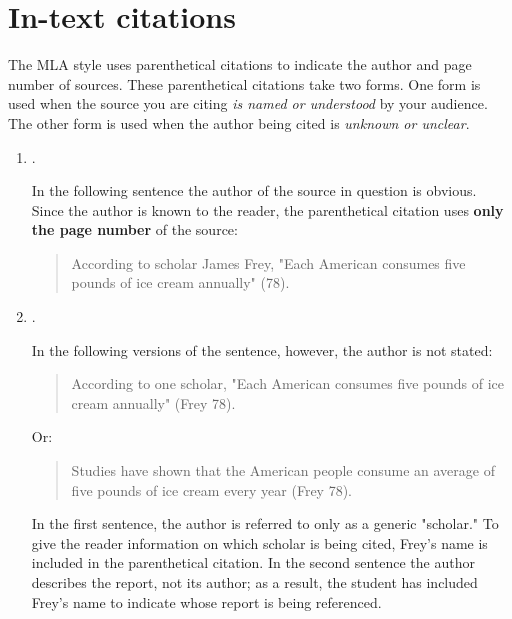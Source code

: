 \newpage

\section{In-text citations}
The MLA style uses parenthetical citations to indicate the author and page number of sources. These parenthetical citations take two forms. One form is used when the source you are citing \emph{is named or understood} by your audience. The other form is used when the author being cited is \emph{unknown or unclear}. 

\begin{enumerate}

\item {}. \smallskip

In the following sentence the author of the source in question is obvious. Since the author is known to the reader, the parenthetical citation uses \textbf{only the page number} of the source: 

\begin{quote}
According to scholar James Frey, "Each American consumes five pounds of ice cream 
annually" (78).
\end{quote}

\item {}. \smallskip

In the following versions of the sentence, however, the author is not stated:

\begin{quote}
According to one scholar, "Each American consumes five pounds of ice cream 
annually" (Frey 78).
\end{quote}

\noindent Or:
\begin{quote}
Studies have shown that the American people consume an average of five pounds of ice 
cream every year (Frey 78).
\end{quote}

\noindent In the first sentence, the author is referred to only as a generic "scholar." To give the reader information on which scholar is being cited, Frey's name is included in the parenthetical citation. In the second sentence the author describes the report, not its author; as a result, the student has included Frey's name to indicate whose report is being referenced. 

\end{enumerate}

